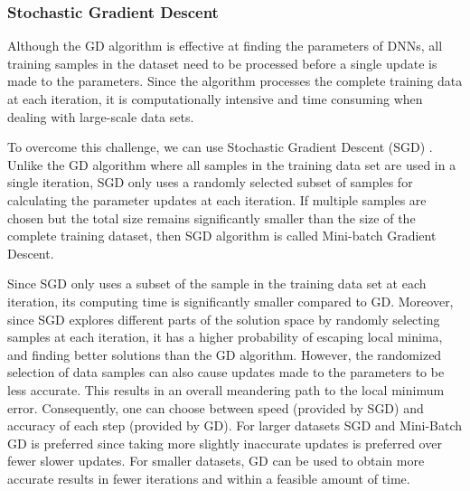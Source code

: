 \documentclass[letterpaper]{article}
\begin{document}
\begin{flushleft}
{%
\subsubsection{Stochastic Gradient Descent}

Although the GD algorithm is effective at finding the parameters of DNNs, all  training samples in the dataset need to be processed
before a single update is made to the parameters. Since the algorithm processes the complete training data at each iteration, 
it is computationally intensive and time consuming when dealing with large-scale data sets. 


To overcome this challenge, we can use Stochastic Gradient Descent (SGD) \cite{bottou2010large}. 
Unlike the GD algorithm where all samples in the training data set are used in a single iteration, SGD only uses a randomly
selected subset of samples for calculating the parameter updates at each iteration. 
If multiple samples are chosen but the total size remains significantly smaller than the size of the complete
training dataset, then SGD algorithm is called Mini-batch Gradient Descent.


Since SGD only uses a subset of the sample in the training data set at each iteration, its computing time is
significantly smaller compared to GD.  Moreover, since SGD explores different parts of the solution space by randomly selecting samples
at each iteration, it has a higher probability of escaping local minima, and finding better solutions than the GD algorithm. 
However, the randomized selection of data samples can also cause updates made to the parameters to be less accurate. This results in an
overall meandering path to the local minimum error. Consequently, one can choose between speed (provided by SGD) and accuracy of each step 
(provided by GD). For larger datasets SGD and Mini-Batch GD is preferred since taking more slightly inaccurate updates is preferred
over fewer slower updates. For smaller datasets, GD can be used to obtain more accurate results in fewer iterations and
within a feasible amount of time. 

}
\end{flushleft}
\end{document}
